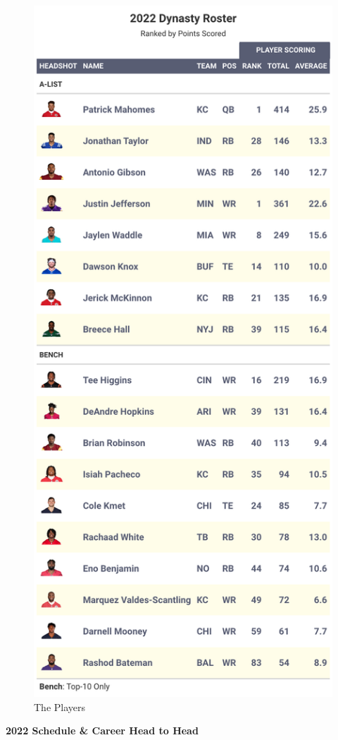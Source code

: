 \documentclass[
]{article}
\begin{document}
\begin{figure}
\includegraphics[width=0.75\linewidth,height=0.75\textheight]{output/2022/dynasty_roster_Bellist} \caption{The Players}\label{fig:unnamed-chunk-18}
\end{figure}
\newpage

\textbf{2022 Schedule \& Career Head to Head}
\end{document}
